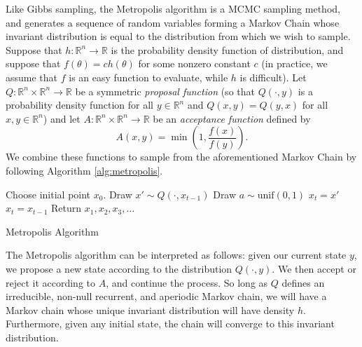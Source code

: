 Like Gibbs sampling, the Metropolis algorithm is a MCMC sampling method, and generates a sequence of random
variables forming a Markov Chain whose invariant distribution is equal to the distribution from which we wish
to sample. Suppose that $h : \mathbb{R}^n \rightarrow \mathbb{R}$ is the probability density function of distribution, 
and suppose that $f(\theta) = ch(\theta)$ for some nonzero constant $c$ (in practice, we assume that $f$ is an easy
function to evaluate, while $h$ is difficult). Let $Q : \mathbb{R}^n \times \mathbb{R}^n \rightarrow \mathbb{R}$ be
a symmetric \emph{proposal function} 
(so that $Q(\cdot, y)$ is a probability density function for all $y \in \mathbb{R}^n$
 and $Q(x,y) = Q(y,x)$ for all $x,y \in \mathbb{R}^n$) and let 
 $A : \mathbb{R}^n \times \mathbb{R}^n \rightarrow \mathbb{R}$ be an \emph{acceptance function} defined by
\[
A(x,y) = \min\left(1, \frac{f(x)}{f(y)}\right).
\]
We combine these functions to sample from the aforementioned Markov Chain by following Algorithm \ref{alg:metropolis}.
\begin{algorithm}
\begin{algorithmic}[1]
    \State \textrm{Choose initial point } $x_0$.
        \State \textrm{Draw } $x' \sim Q(\cdot, x_{t-1})$
        \State \textrm{Draw } $a \sim \text{unif}(0,1)$
            \State $x_t = x'$
        \Else
            \State $x_t = x_{t-1}$
        \EndIf
    \EndFor
    \State \textrm{Return } $x_1,x_2,x_3,\ldots$
\EndProcedure
\end{algorithmic}
\caption{Metropolis Algorithm}
\label{alg:metropolis}
\end{algorithm}
The Metropolis algorithm can be interpreted as follows:
given our current state $y$, we propose a new state according to the distribution $Q(\cdot, y)$. We then accept or reject it according to $A$, and continue the process. So long as $Q$ defines an irreducible, non-null recurrent, and aperiodic Markov chain, we will have a Markov chain whose unique invariant distribution will have density $h$. Furthermore, given any initial state, the chain will converge to this invariant distribution.

